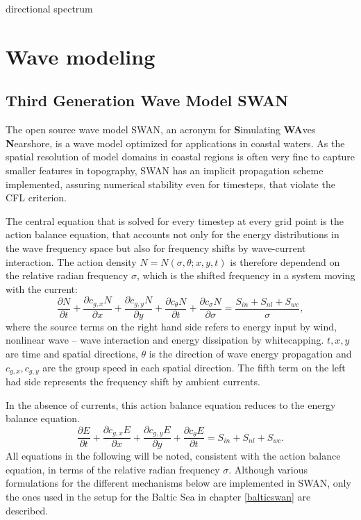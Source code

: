 directional spectrum

\section{Wave modeling}

\subsection{Third Generation Wave Model SWAN}

The open source wave model SWAN, an acronym for \textbf{S}imulating \textbf{WA}ves \textbf{N}earshore, is a wave model optimized for applications in coastal waters. As the spatial resolution of model domains in coastal regions is often very fine to capture smaller features in topography, SWAN has an implicit propagation scheme implemented, assuring numerical stability even for timesteps, that violate the CFL criterion. 

The central equation that is solved for every timestep at every grid point is the action balance equation, that accounts not only for the energy distributions in the wave frequency space but also for frequency shifts by wave-current interaction. The action density $N=N(\sigma,\theta; x,y,t)$ is therefore dependend on the relative radian frequency $\sigma$, which is the shifted frequency in a system moving with the current:
\begin{equation}\label{ebe}
 \frac{\partial N}{\partial t} + \frac{\partial c_{g,x} N}{\partial x} + \frac{ \partial c_{g,y} N}{\partial y} + \frac{\partial c_{\theta} N}{\partial t} + \frac{\partial c_{\sigma} N}{\partial \sigma}= \frac{S_{in} + S_{nl} + S_{wc}}{\sigma},
\end{equation}
where the source terms on the right hand side refers to energy input by wind, nonlinear wave -- wave interaction and energy dissipation by whitecapping. $t, x ,y$ are time and spatial directions, $\theta$ is the direction of wave energy propagation and $c_{g,x}, c_{g,y}$ are the group speed in each spatial direction. The fifth term on the left had side represents the frequency shift by ambient currents.

In the absence of currents, this action balance equation reduces to the energy balance equation.
\begin{equation}\label{ebe}
 \frac{\partial E}{\partial t} + \frac{\partial c_{g,x} E}{\partial x} + \frac{ \partial c_{g,y} E}{\partial y} + \frac{\partial c_{\theta} E}{\partial t} = S_{in} + S_{nl} + S_{wc}.
\end{equation}
All equations in the following will be noted, consistent with the action balance equation, in terms of the relative radian frequency $\sigma$. Although various formulations for the different mechanisms below are implemented in SWAN, only the ones used in the setup for the Baltic Sea in chapter \ref{balticswan} are described.

